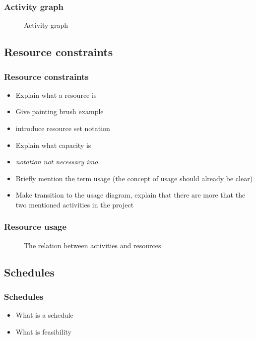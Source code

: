 \documentclass{beamer}
\theoremstyle{definition}
\newcommand{\inputtikz}[1]{}
\newcommand{\mick}[1]{{\color{red}\emph{#1}}}
\begin{document}
\begin{frame}
	\frametitle{Activity graph}
	\vspace{-1em}
	\begin{figure}[ht]
		\makebox[\textwidth][c]{\resizebox{.8\paperwidth}{!}{
			\inputtikz{activity_graph}
		}}
		\vspace{-1em}
		\caption{Activity graph}
		\label{fig:activity_graph}
	\end{figure}
\end{frame}

\subsection{Resource constraints}
\begin{frame}
	\frametitle{Resource constraints}
	\begin{itemize}
		\item Explain what a resource is
		\item Give painting brush example
		\item introduce resource set notation
		\item Explain what capacity is
		\item \mick{notation not necessary imo}
		\item Briefly mention the term usage (the concept of usage should already be clear)
		\item Make transition to the usage diagram, explain that there are more that the two mentioned activities in the project
	\end{itemize}
\end{frame}
	
\begin{frame}
	\frametitle{Resource usage}
	\vspace{-.2em}
	\begin{figure}[ht]
		\makebox[\textwidth][c]{\resizebox{.7\paperwidth}{!}{
			\inputtikz{usage}
		}}
		\vspace{-1em}
		\caption{The relation between activities and resources}
		\label{fig:activity_graph}
	\end{figure}
\end{frame}

\subsection{Schedules}
\begin{frame}
	\frametitle{Schedules}
	\begin{itemize}
		\item What is a schedule
		\item What is feasibility
	\end{itemize}
\end{frame}
\end{document}
